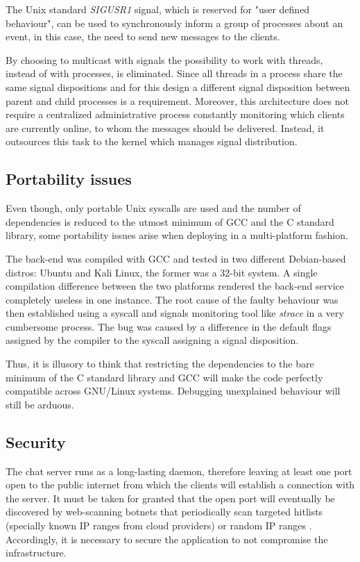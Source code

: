 The Unix standard \textit{SIGUSR1} signal, which is reserved for "user defined behaviour", can be used to synchronously inform a group of processes about an event, in this case, the need to send new messages to the clients.

By choosing to multicast with signals the possibility to work with threads, instead of with processes, is eliminated. Since all threads in a process share the same signal dispositions and for this design a different signal disposition between parent and child processes is a requirement. Moreover, this architecture does not require a centralized administrative process constantly monitoring which clients are currently online, to whom the messages should be delivered. Instead, it outsources this task to the kernel which manages signal distribution.


\subsection{Portability issues}
Even though, only portable Unix syscalls are used and the number of dependencies is reduced to the utmost minimum of GCC and the C standard library, some portability issues arise when deploying in a multi-platform fashion.

The back-end was compiled with GCC and tested in two different Debian-based distros: Ubuntu and Kali Linux, the former was a 32-bit system. A single compilation difference between the two platforms rendered the back-end service completely useless in one instance. The root cause of the faulty behaviour was then established using a syscall and signals monitoring tool like \textit{strace} in a very cumbersome process. The bug was caused by a difference in the default flags assigned by the compiler to the syscall assigning a signal disposition.

Thus, it is illusory to think that restricting the dependencies to the bare minimum of the C standard library and GCC will make the code perfectly compatible across GNU/Linux systems. Debugging unexplained behaviour will still be arduous.

\subsection{Security}
The chat server runs as a long-lasting daemon, therefore leaving at least one port open to the public internet from which the clients will establish a connection with the server. It must be taken for granted that the open port will eventually be discovered by web-scanning botnets that periodically scan targeted hitlists (specially known IP ranges from cloud providers) or random IP ranges \cite{Mirkovic2004}\cite{Graham}. Accordingly, it is necessary to secure the application to not compromise the infrastructure.

